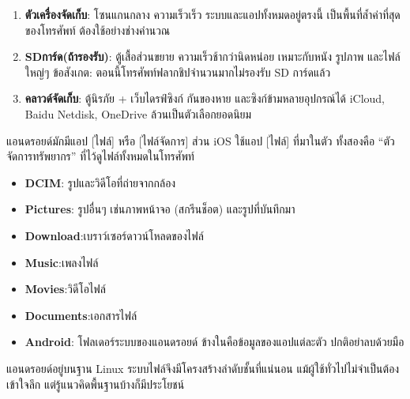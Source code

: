 


\begin{enumerate}
  \item \textbf{ตัวเครื่องจัดเก็บ}: โซนแกนกลาง ความเร็วเร็ว ระบบและแอปทั้งหมดอยู่ตรงนี้ เป็นพื้นที่ล้ำค่าที่สุดของโทรศัพท์ ต้องใช้อย่างช่างคำนวณ
  \item \textbf{SDการ์ด(ถ้ารองรับ)}: ตู้เสื้อส่วนขยาย ความเร็วช้ากว่านิดหน่อย เหมาะกับหนัง รูปภาพ และไฟล์ใหญ่ๆ ข้อสังเกต: ตอนนี้โทรศัพท์ฟลากชิปจำนวนมากไม่รองรับ SD การ์ดแล้ว
  \item \textbf{คลาวด์จัดเก็บ}: ตู้นิรภัย + เว็บไดรฟ์ซิงก์ กันของหาย และซิงก์ข้ามหลายอุปกรณ์ได้ iCloud, Baidu Netdisk, OneDrive ล้วนเป็นตัวเลือกยอดนิยม
\end{enumerate}


แอนดรอยด์มักมีแอป [ไฟล์] หรือ [ไฟล์จัดการ] ส่วน iOS ใช้แอป [ไฟล์] ที่มาในตัว ทั้งสองคือ “ตัวจัดการทรัพยากร” ที่ไว้ดูไฟล์ทั้งหมดในโทรศัพท์


\begin{itemize}
  \item \textbf{DCIM}: รูปและวิดีโอที่ถ่ายจากกล้อง
  \item \textbf{Pictures}: รูปอื่นๆ เช่นภาพหน้าจอ (สกรีนช็อต) และรูปที่บันทึกมา
  \item \textbf{Download}:เบราว์เซอร์ดาวน์โหลดของไฟล์
  \item \textbf{Music}:เพลงไฟล์
  \item \textbf{Movies}:วิดีโอไฟล์
  \item \textbf{Documents}:เอกสารไฟล์
  \item \textbf{Android}: โฟลเดอร์ระบบของแอนดรอยด์ ข้างในคือข้อมูลของแอปแต่ละตัว ปกติอย่าลบด้วยมือ
\end{itemize}


แอนดรอยด์อยู่บนฐาน Linux ระบบไฟล์จึงมีโครงสร้างลำดับชั้นที่แน่นอน แม้ผู้ใช้ทั่วไปไม่จำเป็นต้องเข้าใจลึก แต่รู้แนวคิดพื้นฐานบ้างก็มีประโยชน์

